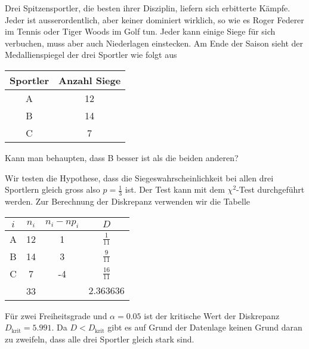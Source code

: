 Drei Spitzensportler, die besten ihrer Disziplin, liefern sich erbitterte
Kämpfe. Jeder ist ausserordentlich, aber keiner dominiert wirklich,
so wie es Roger Federer im Tennis oder Tiger Woods im Golf tun. Jeder
kann einige Siege für sich verbuchen, muss aber auch Niederlagen
einstecken. Am Ende der Saison sieht der Medallienspiegel der drei
Sportler wie folgt aus
\begin{center}
\begin{tabular}{|c|c|}
\hline
Sportler&Anzahl Siege\\
\hline
A&12\\
B&14\\
C&7\\
\hline
\end{tabular}
\end{center}
Kann man behaupten, dass B besser ist als die beiden anderen?


\begin{loesung}
Wir testen die Hypothese, dass die Siegeswahrscheinlichkeit bei allen
drei Sportlern gleich gross also $p=\frac13$ ist. Der Test kann mit
dem $\chi^2$-Test durchgeführt werden. Zur Berechnung der Diskrepanz
verwenden wir die Tabelle
\begin{center}
\begin{tabular}{|c|c|c|c|}
\hline
$i$&$n_i$&$n_i-np_i$&$D$\\
\hline
A&12&1&$\frac{1}{11}$\\
B&14&3&$\frac{9}{11}$\\
C& 7&-4&$\frac{16}{11}$\\
\hline
&33&&$2.363636$\\
\hline
\end{tabular}
\end{center}
Für zwei Freiheitsgrade und $\alpha=0.05$ ist der kritische Wert der
Diskrepanz $D_{\text{krit}}=5.991$. Da $D<D_{\text{krit}}$ gibt es
auf Grund der Datenlage keinen Grund daran zu zweifeln, dass alle drei
Sportler gleich stark sind.
\end{loesung}

